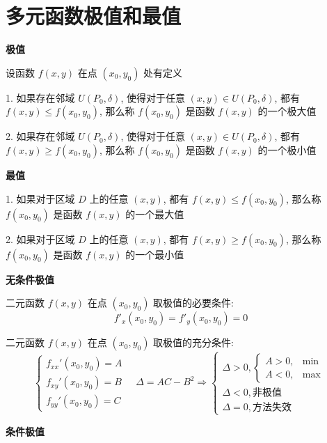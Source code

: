 \section{多元函数极值和最值}
\begin{definition}[多元函数极值和最值]
	\textbf{极值}

	设函数 $f(x,y)$ 在点 $(x_{0},y_{0})$ 处有定义
	
	1. 如果存在邻域 $U(P_{0},\delta)$, 使得对于任意 $(x,y)\in U(P_{0},\delta)$, 都有 $f(x,y)\leq f(x_{0},y_{0})$, 那么称 $f(x_{0},y_{0})$ 是函数 $f(x,y)$ 的一个极大值
	
	2. 如果存在邻域 $U(P_{0},\delta)$, 使得对于任意 $(x,y)\in U(P_{0},\delta)$, 都有 $f(x,y)\geq f(x_{0},y_{0})$, 那么称 $f(x_{0},y_{0})$ 是函数 $f(x,y)$ 的一个极小值

	\textbf{最值}

	1. 如果对于区域 $D$ 上的任意 $(x,y)$, 都有 $f(x,y)\leq f(x_{0},y_{0})$, 那么称 $f(x_{0},y_{0})$ 是函数 $f(x,y)$ 的一个最大值

	2. 如果对于区域 $D$ 上的任意 $(x,y)$, 都有 $f(x,y)\geq f(x_{0},y_{0})$, 那么称 $f(x_{0},y_{0})$ 是函数 $f(x,y)$ 的一个最小值
\end{definition}
\textbf{无条件极值}
\begin{definition}[多元函数极值]
	二元函数 $f(x,y)$ 在点 $(x_{0},y_{0})$ 取极值的必要条件: 
	$$f'_{x}(x_{0},y_{0})=f'_{y}(x_{0},y_{0})=0$$
	
	二元函数 $f(x,y)$ 在点 $(x_{0},y_{0})$ 取极值的充分条件: 
	$$\begin{cases}
		f_{xx}'(x_{0},y_{0})=A\\
		f_{xy}'(x_{0},y_{0})=B\\
		f_{yy}'(x_{0},y_{0})=C
	\end{cases}  
	\quad \Delta=AC-B^2\Rightarrow
	\begin{cases}
		\Delta>0,\begin{cases} A>0, & \min\\A<0, & \max\end{cases}\\
		\Delta<0, \text{非极值}\\ 
		\Delta=0, \text{方法失效}
	\end{cases}
	$$
\end{definition}
\textbf{条件极值}
